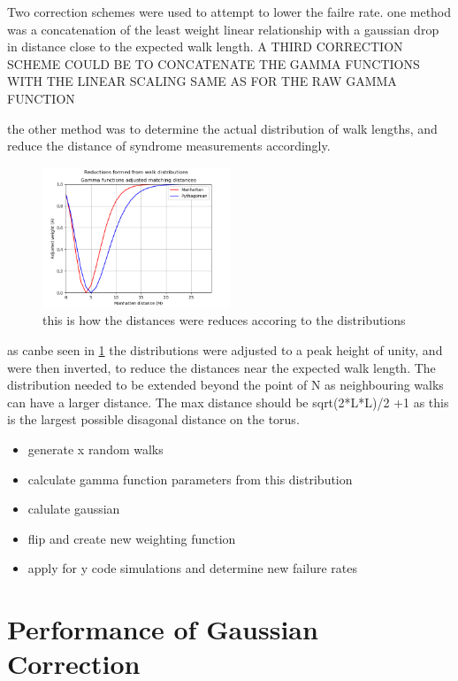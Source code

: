 Two correction schemes were used to attempt to lower the failre rate. one method was a concatenation of the least weight linear relationship with a gaussian drop in distance close to the expected walk length. 
A THIRD CORRECTION SCHEME COULD BE TO CONCATENATE THE GAMMA FUNCTIONS WITH THE LINEAR SCALING SAME AS FOR THE RAW GAMMA FUNCTION


the other method was to determine the actual distribution of walk lengths, and reduce the distance of syndrome measurements accordingly.

\begin{figure}[htpb]
	\centering
	\includegraphics[width= 0.5\textwidth]{figs/gamma_corrections.png}
	\caption{this is how the distances were reduces accoring to the distributions}
	\label{fig:gamma}
\end{figure}
as canbe seen in \ref{fig:gamma} the distributions were adjusted to a peak height of unity, and were then inverted, to reduce the distances near the expected walk length. The distribution needed to be extended beyond the point of N as neighbouring walks can have a larger distance. The max distance should be sqrt(2*L*L)/2 +1 as this is the largest possible disagonal distance on the torus. 
\begin{itemize}
	\item generate x random walks 
	\item calculate gamma function parameters from this distribution
	\item calulate gaussian
	\item flip and create new weighting function
	\item apply for y code simulations and determine new failure rates
\end{itemize}

\section{Performance of Gaussian Correction}

